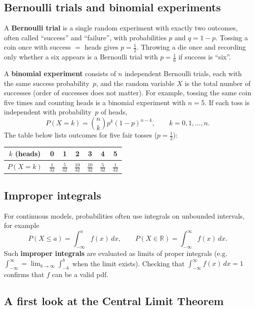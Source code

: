 \subsection{Bernoulli trials and binomial experiments}

A \textbf{Bernoulli trial} is a single random experiment with exactly two outcomes, often called ``success'' and ``failure'', with probabilities $p$ and $q=1-p$. Tossing a coin once with success $=$ heads gives $p=\tfrac12$. Throwing a die once and recording only whether a six appears is a Bernoulli trial with $p=\tfrac16$ if success is ``six''.

A \textbf{binomial experiment} consists of $n$ independent Bernoulli trials, each with the same success probability~$p$, and the random variable $X$ is the total number of successes (order of successes does not matter). For example, tossing the same coin five times and counting heads is a binomial experiment with $n=5$. If each toss is independent with probability~$p$ of heads,
\[
P(X=k)=\binom{n}{k} p^k(1-p)^{n-k},\qquad k=0,1,\ldots,n.
\]
The table below lists outcomes for five fair tosses ($p=\tfrac12$):

\begin{center}
\begin{tabular}{|c|c|c|c|c|c|c|}
\hline
$k$ (heads) & 0 & 1 & 2 & 3 & 4 & 5 \\
\hline
$P(X=k)$ & $\frac{1}{32}$ & $\frac{5}{32}$ & $\frac{10}{32}$ & $\frac{10}{32}$ & $\frac{5}{32}$ & $\frac{1}{32}$ \\
\hline
\end{tabular}
\end{center}

\subsection{Improper integrals}

For continuous models, probabilities often use integrals on unbounded intervals, for example
\[
P(X\le a)=\int_{-\infty}^{a} f(x)\,dx,\qquad
P(X\in\mathbb{R})=\int_{-\infty}^{\infty} f(x)\,dx.
\]
Such \textbf{improper integrals} are evaluated as limits of proper integrals (e.g.\ $\int_{-\infty}^{\infty}=\lim_{b\to\infty}\int_{-b}^{b}$ when the limit exists). Checking that $\int_{-\infty}^{\infty} f(x)\,dx=1$ confirms that $f$ can be a valid pdf.

\subsection{A first look at the Central Limit Theorem}

